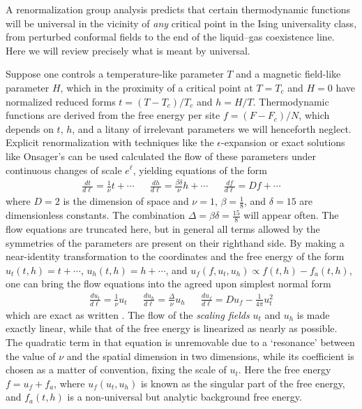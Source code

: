 \documentclass[
aps,
pre,
preprint,
longbibliography,
floatfix
]{revtex4-2}
\begin{document}
A renormalization group analysis predicts that certain thermodynamic functions
will be universal in the vicinity of \emph{any} critical point in the Ising
universality class, from perturbed conformal fields to the end of the
liquid--gas coexistence line. Here we will review precisely what is meant by
universal.

Suppose one controls a temperature-like parameter $T$ and a magnetic field-like
parameter $H$, which in the proximity of a critical point at $T=T_c$ and $H=0$
have normalized reduced forms $t=(T-T_c)/T_c$ and $h=H/T$. Thermodynamic
functions are derived from the free energy per site $f=(F-F_c)/N$, which
depends on $t$, $h$, and a litany of irrelevant parameters we will henceforth
neglect.  Explicit renormalization with techniques like the
$\epsilon$-expansion or exact solutions like Onsager's can be used calculated
the flow of these parameters under continuous changes of scale $e^\ell$,
yielding equations of the form
\begin{align} \label{eq:raw.flow}
  \frac{dt}{d\ell}=\frac1\nu t+\cdots
  &&
  \frac{dh}{d\ell}=\frac{\beta\delta}\nu h+\cdots
  &&
  \frac{df}{d\ell}=Df+\cdots
\end{align}
where $D=2$ is the dimension of space and $\nu=1$, $\beta=\frac18$, and
$\delta=15$ are dimensionless constants. The combination
$\Delta=\beta\delta=\frac{15}8$ will appear often. The flow equations are
truncated here, but in general all terms allowed by the symmetries of the
parameters are present on their righthand side. By making a near-identity
transformation to the coordinates and the free energy of the form $u_t(t,
h)=t+\cdots$, $u_h(t, h)=h+\cdots$, and $u_f(f,u_t,u_h)\propto f(t,h)-f_a(t,h)$, one can bring
the flow equations into the agreed upon simplest normal form
\begin{align} \label{eq:flow}
  \frac{du_t}{d\ell}=\frac1\nu u_t
  &&
  \frac{du_h}{d\ell}=\frac{\Delta}\nu u_h
  &&
  \frac{du_f}{d\ell}=Du_f-\frac1{4\pi}u_t^2
\end{align}
which are exact as written \cite{Raju_2019_Normal}. The flow of the
\emph{scaling fields} $u_t$ and $u_h$ is made exactly linear, while that of the
free energy is linearized as nearly as possible. The quadratic term in that
equation is unremovable due to a `resonance' between the value of $\nu$ and the
spatial dimension in two dimensions, while its coefficient is chosen as a
matter of convention, fixing the scale of $u_t$. Here the free energy $f=u_f+f_a$, where $u_f(u_t,u_h)$ is known as the singular part of the free energy, and $f_a(t,h)$ is a non-universal but analytic background free energy.
\end{document}
